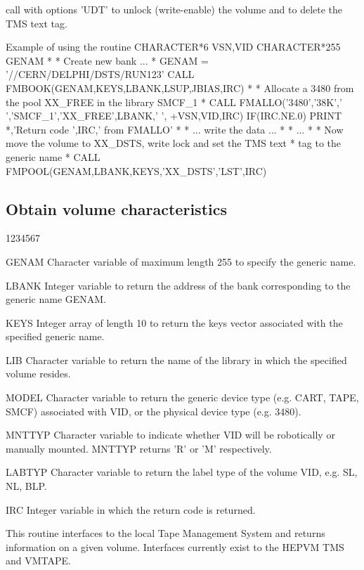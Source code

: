 call  with options 'UDT' to unlock (write-enable) the
volume and to delete the TMS text tag.
\begin{XMPt}{Example of using the routine \protect{}}
      CHARACTER*6   VSN,VID
      CHARACTER*255 GENAM
*
*     Create new bank ...
*
      GENAM = '//CERN/DELPHI/DSTS/RUN123'
      CALL FMBOOK(GENAM,KEYS,LBANK,LSUP,JBIAS,IRC)
*
*     Allocate a 3480 from the pool XX_FREE in the library SMCF_1
*
      CALL FMALLO('3480','38K',' ','SMCF_1','XX_FREE',LBANK,' ',
     +VSN,VID,IRC)
      IF(IRC.NE.0) PRINT *,'Return code ',IRC,' from FMALLO'
*
* ... write the data ...
*
* ...
*
*     Now move the volume to XX_DSTS, write lock and set the TMS text
*     tag to the generic name
*
      CALL FMPOOL(GENAM,LBANK,KEYS,'XX_DSTS','LST',IRC)
\end{XMPt}
\subsection{Obtain volume characteristics}
\begin{DLtt}{1234567}
\item[GENAM]
Character variable of maximum length 255 to specify the generic name.
\item[LBANK]
Integer variable to return the address of the bank corresponding
to the generic name GENAM.
\item[KEYS]
Integer array of length 10 to return the keys vector associated
with the specified generic name.
\item[LIB]
Character variable to return the name of the library in which
the specified volume resides.
\item[MODEL]
Character variable to return the generic device type (e.g. CART,
TAPE, SMCF) associated with VID, or the physical device type (e.g. 3480).
\item[MNTTYP]
Character variable to indicate whether VID will be robotically
or manually mounted. MNTTYP returns 'R' or 'M' respectively.
\item[LABTYP]
Character variable to return the label type of the volume VID,
e.g. SL, NL, BLP.
\item[IRC]
Integer variable in which the return code is returned.
\end{DLtt}
\par
This routine interfaces to the local Tape Management System
and returns information on a given volume. 
Interfaces currently exist to the HEPVM TMS and VMTAPE.
